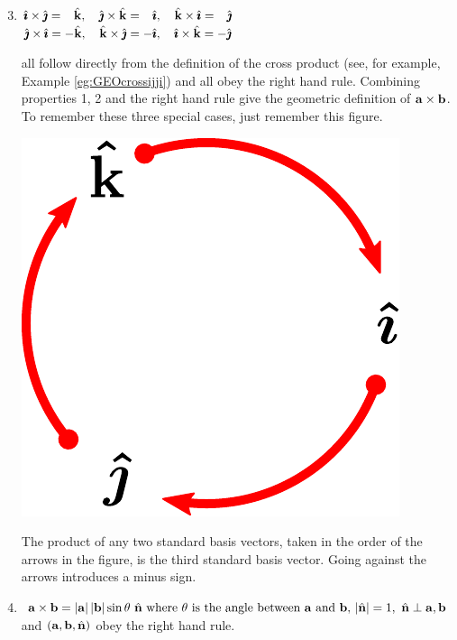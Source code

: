 \begin{enumerate}[(1)]
\setcounter{enumi}{2}
\item $\hi\times\hj=\phantom{-}\hk,\ \ \ \hj\times\hk=\phantom{-}\hi,\ \ \  \hk\times\hi=\phantom{-}\hj$ \\
      $\hj\times\hi=-\hk,\ \ \ \hk\times\hj=-\hi,\ \ \ \hi\times\hk=-\hj$

all follow directly from the definition of the cross product (see, for example,
Example \ref{eg:GEOcrossijji}) and all 
obey the right hand rule.  Combining properties 1, 2 and the right hand 
rule give the geometric definition of $\mathbf{a}\times\mathbf{b}$. To remember
these three special cases, just remember this figure.
      \begin{efig} 
      \begin{center}
      \includegraphics[scale=0.3]{cp_circle.pdf}
      \end{center}
      \end{efig}
The product of any two standard basis vectors, taken in the order of 
the arrows in the figure, is the third standard basis vector.
Going against the arrows introduces a minus sign.


\item $\va\times\vb=|\va|\,|\vb|\sin\theta\ \hn
\text{ where $\theta$ is the angle between $\va$ and $\vb$, }
|\hn|=1,\ \hn\perp\va,\vb$
  and $(\mathbf{a},\mathbf{b},\hat{\mathbf{n}})$ obey the right hand rule.


\end{enumerate}
